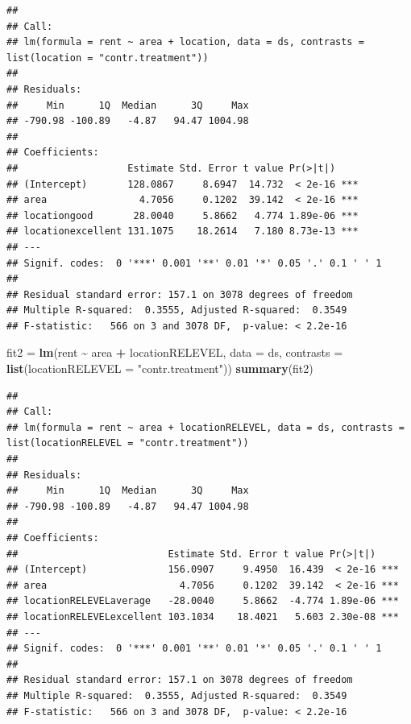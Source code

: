 \documentclass[
]{article}
\newenvironment{Shaded}{\begin{snugshade}}{\end{snugshade}}
\newcommand{\AttributeTok}[1]{\textcolor[rgb]{0.13,0.29,0.53}{#1}}
\newcommand{\FunctionTok}[1]{\textcolor[rgb]{0.13,0.29,0.53}{\textbf{#1}}}
\newcommand{\NormalTok}[1]{#1}
\newcommand{\OtherTok}[1]{\textcolor[rgb]{0.56,0.35,0.01}{#1}}
\newcommand{\SpecialCharTok}[1]{\textcolor[rgb]{0.81,0.36,0.00}{\textbf{#1}}}
\newcommand{\StringTok}[1]{\textcolor[rgb]{0.31,0.60,0.02}{#1}}
\begin{document}
\begin{verbatim}
## 
## Call:
## lm(formula = rent ~ area + location, data = ds, contrasts = list(location = "contr.treatment"))
## 
## Residuals:
##     Min      1Q  Median      3Q     Max 
## -790.98 -100.89   -4.87   94.47 1004.98 
## 
## Coefficients:
##                   Estimate Std. Error t value Pr(>|t|)    
## (Intercept)       128.0867     8.6947  14.732  < 2e-16 ***
## area                4.7056     0.1202  39.142  < 2e-16 ***
## locationgood       28.0040     5.8662   4.774 1.89e-06 ***
## locationexcellent 131.1075    18.2614   7.180 8.73e-13 ***
## ---
## Signif. codes:  0 '***' 0.001 '**' 0.01 '*' 0.05 '.' 0.1 ' ' 1
## 
## Residual standard error: 157.1 on 3078 degrees of freedom
## Multiple R-squared:  0.3555, Adjusted R-squared:  0.3549 
## F-statistic:   566 on 3 and 3078 DF,  p-value: < 2.2e-16
\end{verbatim}

\begin{Shaded}
\begin{Highlighting}[]
\NormalTok{fit2 }\OtherTok{=} \FunctionTok{lm}\NormalTok{(rent }\SpecialCharTok{\textasciitilde{}}\NormalTok{ area }\SpecialCharTok{+}\NormalTok{ locationRELEVEL, }\AttributeTok{data =}\NormalTok{ ds, }\AttributeTok{contrasts =} \FunctionTok{list}\NormalTok{(}\AttributeTok{locationRELEVEL =} \StringTok{"contr.treatment"}\NormalTok{))}
\FunctionTok{summary}\NormalTok{(fit2)}
\end{Highlighting}
\end{Shaded}

\begin{verbatim}
## 
## Call:
## lm(formula = rent ~ area + locationRELEVEL, data = ds, contrasts = list(locationRELEVEL = "contr.treatment"))
## 
## Residuals:
##     Min      1Q  Median      3Q     Max 
## -790.98 -100.89   -4.87   94.47 1004.98 
## 
## Coefficients:
##                          Estimate Std. Error t value Pr(>|t|)    
## (Intercept)              156.0907     9.4950  16.439  < 2e-16 ***
## area                       4.7056     0.1202  39.142  < 2e-16 ***
## locationRELEVELaverage   -28.0040     5.8662  -4.774 1.89e-06 ***
## locationRELEVELexcellent 103.1034    18.4021   5.603 2.30e-08 ***
## ---
## Signif. codes:  0 '***' 0.001 '**' 0.01 '*' 0.05 '.' 0.1 ' ' 1
## 
## Residual standard error: 157.1 on 3078 degrees of freedom
## Multiple R-squared:  0.3555, Adjusted R-squared:  0.3549 
## F-statistic:   566 on 3 and 3078 DF,  p-value: < 2.2e-16
\end{verbatim}
\end{document}
